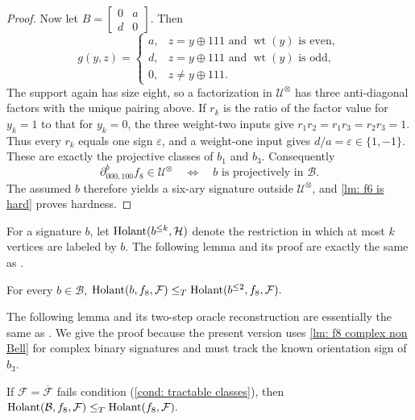 \begin{proof}
Now let
$B=\left[\begin{smallmatrix}0&a\\d&0\end{smallmatrix}\right]$.
Then
\[
 g(y,z)=
 \begin{cases}
 a,&z=y\oplus111\text{ and }\operatorname{wt}(y)\text{ is even},\\
 d,&z=y\oplus111\text{ and }\operatorname{wt}(y)\text{ is odd},\\
 0,&z\neq y\oplus111.
 \end{cases}
\]
The support again has size eight, so a factorization in
$\mathcal U^{\otimes}$ has three anti-diagonal factors with the unique
pairing above.  If $r_k$ is the ratio of the factor value for $y_k=1$ to
that for $y_k=0$, the three weight-two inputs give
$r_1r_2=r_1r_3=r_2r_3=1$.  Thus every $r_k$ equals one sign
$\varepsilon$, and a weight-one input gives $d/a=\varepsilon\in\{1,-1\}$.
These are exactly the projective classes of $b_1$ and $b_3$.
Consequently
\begin{equation}
 \partial_{000,100}^{b}f_8\in\mathcal U^{\otimes}
 \quad\Longleftrightarrow\quad
 b\text{ is projectively in }\mathcal B.
 \label{eq: non Bell iff six obstruction}
\end{equation}
The assumed $b$ therefore yields a six-ary signature outside
$\mathcal U^{\otimes}$, and \cref{lm: f6 is hard} proves hardness.
\end{proof}

For a signature $b$, let $\operatorname{Holant}(b^{\leq k},\mathcal H)$ denote the restriction in which at most $k$ vertices are labeled by $b$.
The following lemma and its proof are exactly the same as
\cite[Lemma~8.9]{realholant}.

\begin{lemma}
\label{lm: f8 three Bell copies}
    For every $b\in\mathcal B$,
    $
     \operatorname{Holant}(b,f_8,\mathcal F)
     \leq_T\operatorname{Holant}(b^{\leq2},f_8,\mathcal F).
    $
\end{lemma}

The following lemma and its two-step oracle reconstruction are essentially
the same as \cite[Lemma~8.10]{realholant}.  We give the proof because the
present version uses \cref{lm: f8 complex non Bell} for complex binary
signatures and must track the known orientation sign of $b_3$.

\begin{lemma}
\label{lm: f8 Bell simulation}
If $\mathcal F=\overline{\mathcal F}$ fails condition
\rm{(\ref{cond: tractable classes})}, then
\(
 \operatorname{Holant}(\mathcal B,f_8,\mathcal F)
 \leq_T\operatorname{Holant}(f_8,\mathcal F).
 \label{eq: simulate Bell f8}
\)
\end{lemma}

